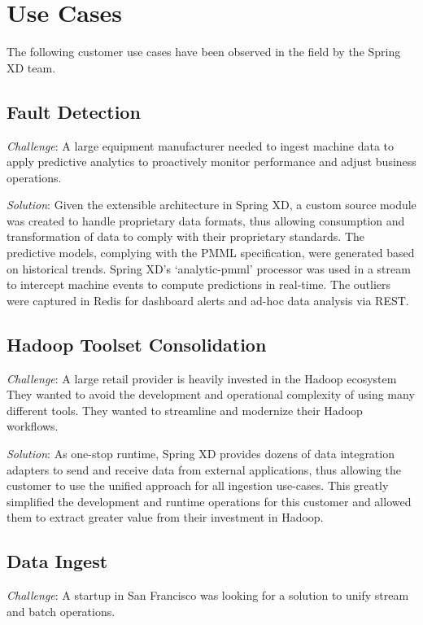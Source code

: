 \section{Use Cases}
\label{sec:Use Cases}

The following customer use cases have been observed in the field by the Spring XD team.

\subsection{Fault Detection}
\textit{Challenge}: A large equipment manufacturer needed to
ingest machine data to apply predictive analytics to proactively monitor
performance and adjust business operations.

\textit{Solution}: Given the extensible architecture in Spring XD, a custom
source module was created to handle proprietary data formats, thus allowing
consumption and transformation of data to comply with their proprietary
standards. The predictive models, complying with the PMML specification, were
generated based on historical trends. Spring XD's `analytic-pmml' processor was
used in a stream to intercept machine events to compute predictions in
real-time. The outliers were captured in Redis\cite{redis} for dashboard alerts
and ad-hoc data analysis via REST.

\subsection{Hadoop Toolset Consolidation}

\textit{Challenge}: A large retail provider is heavily invested in the Hadoop ecosystem
They wanted to avoid the development and operational complexity of using many
different tools. They wanted to streamline and modernize their Hadoop workflows.

\textit{Solution}: As one-stop runtime, Spring XD provides dozens of data integration
adapters to send and receive data from external applications, thus allowing
the customer to use the unified approach for all ingestion use-cases. This
greatly simplified the development and runtime operations for this customer
and allowed them to extract greater value from their investment in Hadoop.

\subsection{Data Ingest}
\textit{Challenge}: A startup in San Francisco was looking for a solution to
unify stream and batch operations.

